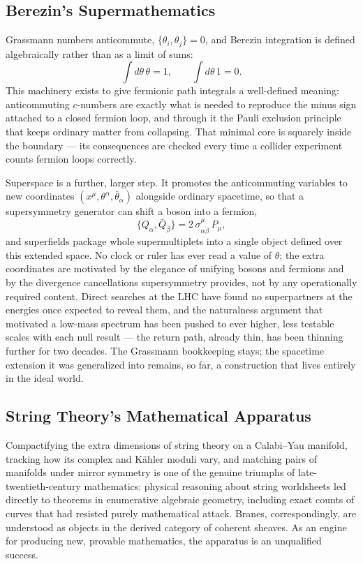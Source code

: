 \subsection{Berezin's Supermathematics }

Grassmann numbers anticommute, $\{\theta_i,\theta_j\}=0$, and Berezin
integration is defined algebraically rather than as a limit of sums:
\[
\int d\theta\,\theta = 1, \qquad \int d\theta\, 1 = 0 .
\]
This machinery exists to give fermionic path integrals a well-defined meaning:
anticommuting $c$-numbers are exactly what is needed to reproduce the minus
sign attached to a closed fermion loop, and through it the Pauli exclusion
principle that keeps ordinary matter from collapsing. That minimal core is
squarely inside the boundary --- its consequences are checked every time a
collider experiment counts fermion loops correctly.

Superspace is a further, larger step. It promotes the anticommuting variables
to new coordinates $(x^\mu,\theta^\alpha,\bar\theta_{\dot\alpha})$ alongside
ordinary spacetime, so that a supersymmetry generator can shift a boson into a
fermion,
\[
\{Q_\alpha, \bar Q_{\dot\beta}\} = 2\,\sigma^\mu_{\alpha\dot\beta}\,P_\mu ,
\]
and superfields package whole supermultiplets into a single object defined over
this extended space. No clock or ruler has ever read a value of $\theta$; the
extra coordinates are motivated by the elegance of unifying bosons and fermions
and by the divergence cancellations supersymmetry provides, not by any
operationally required content. Direct searches at the LHC have found no
superpartners at the energies once expected to reveal them, and the naturalness
argument that motivated a low-mass spectrum has been pushed to ever higher,
less testable scales with each null result --- the return path, already thin,
has been thinning further for two decades. The Grassmann bookkeeping stays; the
spacetime extension it was generalized into remains, so far, a construction
that lives entirely in the ideal world.

\subsection{String Theory's Mathematical Apparatus }

Compactifying the extra dimensions of string theory on a Calabi--Yau manifold,
tracking how its complex and K\"ahler moduli vary, and matching pairs of
manifolds under mirror symmetry is one of the genuine triumphs of
late-twentieth-century mathematics: physical reasoning about string worldsheets
led directly to theorems in enumerative algebraic geometry, including exact
counts of curves that had resisted purely mathematical attack. Branes,
correspondingly, are understood as objects in the derived category of coherent
sheaves. As an engine for producing new, provable mathematics, the apparatus is
an unqualified success.

